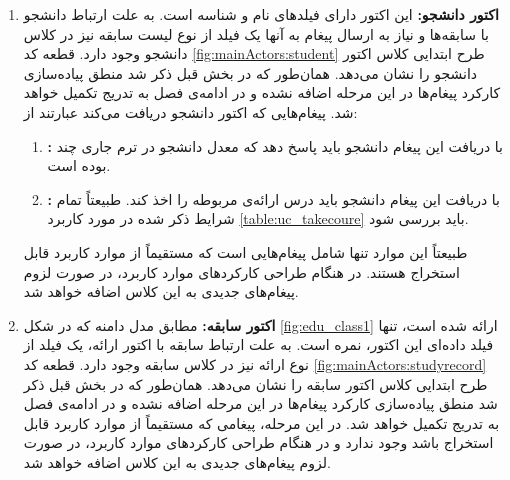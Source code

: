 \begin{enumerate}
\item\textbf{اکتور دانشجو:}
این اکتور دارای فیلد‌های نام و شناسه است. به علت ارتباط دانشجو با سابقه‌ها و نیاز  به ارسال پیغام به آنها یک فیلد از نوع لیست سابقه نیز در کلاس دانشجو وجود دارد. قطعه کد \ref{fig:mainActors:student} طرح ابتدایی کلاس اکتور دانشجو را نشان می‌دهد. همان‌طور که در بخش قبل ذکر شد منطق پیاده‌سازی کارکرد پیغام‌ها در این مرحله اضافه نشده و در ادامه‌ی فصل به تدریج تکمیل خواهد شد. پیغام‌هایی که اکتور دانشجو دریافت می‌کند عبارتند از:
\begin{enumerate}
\item\textbf{:}
با دریافت این پیغام دانشجو باید پاسخ دهد که معدل دانشجو در ترم جاری  چند بوده است.
\item\textbf{:}
با دریافت این پیغام دانشجو باید درس ارائه‌ی مربوطه را اخذ کند. طبیعتاً تمام شرایط ذکر شده در مورد کاربرد \ref{table:uc_takecoure} باید بررسی شود.
\end{enumerate}
طبیعتاً این موارد تنها شامل پیغام‌هایی است که مستقیماً از موارد کاربرد قابل استخراج هستند. در هنگام طراحی کارکردهای موارد کاربرد، در صورت لزوم پیغام‌های جدیدی به این کلاس اضافه خواهد شد.
\item\textbf{اکتور سابقه:}
مطابق مدل دامنه‌ که در شکل \ref{fig:edu_class1} ارائه شده است، تنها فیلد داده‌ای این اکتور، نمره است. به علت ارتباط سابقه با اکتور ارائه، یک فیلد از نوع ارائه نیز در کلاس سابقه وجود دارد. قطعه کد \ref{fig:mainActors:studyrecord} طرح ابتدایی کلاس اکتور سابقه را نشان می‌دهد. همان‌طور که در بخش قبل ذکر شد منطق پیاده‌سازی کارکرد پیغام‌ها در این مرحله اضافه نشده و در ادامه‌ی فصل به تدریج تکمیل خواهد شد. در این مرحله، پیغامی که مستقیماً از موارد کاربرد قابل استخراج باشد وجود ندارد
و در هنگام طراحی کارکردهای موارد کاربرد، در صورت لزوم پیغام‌های جدیدی به این کلاس اضافه خواهد شد.

\end{enumerate}
